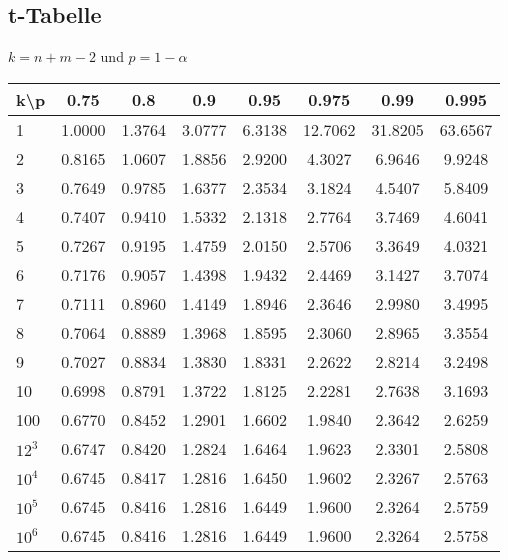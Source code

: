 \subsection{t-Tabelle}
$k=n + m - 2$ und $p = 1- \alpha$ \\
\begin{tabular}{|g|c|c|c|c|c|c|c|}
    \hline
    k\textbackslash p  & 0.75   & 0.8    & 0.9    & 0.95   & 0.975   & 0.99    & 0.995   \\
       & 1.0000 & 1.3764 & 3.0777 & 6.3138 & 12.7062 & 31.8205 & 63.6567 \\
    2   & 0.8165 & 1.0607 & 1.8856 & 2.9200 & 4.3027  & 6.9646  & 9.9248  \\
    3   & 0.7649 & 0.9785 & 1.6377 & 2.3534 & 3.1824  & 4.5407  & 5.8409  \\
    4   & 0.7407 & 0.9410 & 1.5332 & 2.1318 & 2.7764  & 3.7469  & 4.6041  \\
    5   & 0.7267 & 0.9195 & 1.4759 & 2.0150 & 2.5706  & 3.3649  & 4.0321  \\
    6   & 0.7176 & 0.9057 & 1.4398 & 1.9432 & 2.4469  & 3.1427  & 3.7074  \\
    7   & 0.7111 & 0.8960 & 1.4149 & 1.8946 & 2.3646  & 2.9980  & 3.4995  \\
    8   & 0.7064 & 0.8889 & 1.3968 & 1.8595 & 2.3060  & 2.8965  & 3.3554  \\
    9   & 0.7027 & 0.8834 & 1.3830 & 1.8331 & 2.2622  & 2.8214  & 3.2498  \\
    10  & 0.6998 & 0.8791 & 1.3722 & 1.8125 & 2.2281  & 2.7638  & 3.1693  \\
    100 & 0.6770 & 0.8452 & 1.2901 & 1.6602 & 1.9840  & 2.3642  & 2.6259  \\
    $12^3$ & 0.6747 & 0.8420 & 1.2824 & 1.6464 & 1.9623  & 2.3301  & 2.5808  \\
    $10^4$ & 0.6745 & 0.8417 & 1.2816 & 1.6450 & 1.9602  & 2.3267  & 2.5763  \\
    $10^5$ & 0.6745 & 0.8416 & 1.2816 & 1.6449 & 1.9600  & 2.3264  & 2.5759  \\
    $10^6$ & 0.6745 & 0.8416 & 1.2816 & 1.6449 & 1.9600  & 2.3264  & 2.5758  \\
    \hline
\end{tabular}
